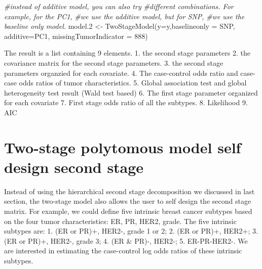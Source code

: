 \documentclass[11pt,]{article}
\newenvironment{Shaded}{\begin{snugshade}}{\end{snugshade}}
\newcommand{\AttributeTok}[1]{\textcolor[rgb]{0.77,0.63,0.00}{#1}}
\newcommand{\CommentTok}[1]{\textcolor[rgb]{0.56,0.35,0.01}{\textit{#1}}}
\newcommand{\DecValTok}[1]{\textcolor[rgb]{0.00,0.00,0.81}{#1}}
\newcommand{\FloatTok}[1]{\textcolor[rgb]{0.00,0.00,0.81}{#1}}
\newcommand{\FunctionTok}[1]{\textcolor[rgb]{0.00,0.00,0.00}{#1}}
\newcommand{\NormalTok}[1]{#1}
\newcommand{\OtherTok}[1]{\textcolor[rgb]{0.56,0.35,0.01}{#1}}
\begin{document}
\begin{Shaded}
\begin{Highlighting}[]
\CommentTok{\#instead of additive model, you can also try }
\CommentTok{\#different combinations. For example, for the PC1,}
\CommentTok{\#we use the additive model, but for SNP,}
\CommentTok{\#we use the baseline only model.}
\NormalTok{model}\FloatTok{.2} \OtherTok{\textless{}{-}} \FunctionTok{TwoStageModel}\NormalTok{(}\AttributeTok{y=}\NormalTok{y,}\AttributeTok{baselineonly =}\NormalTok{ SNP,}
                         \AttributeTok{additive=}\NormalTok{PC1,}
                         \AttributeTok{missingTumorIndicator =} \DecValTok{888}\NormalTok{)}
\end{Highlighting}
\end{Shaded}

The result is a list containing 9 elements. 1. the second stage
parameters 2. the covariance matrix for the second stage parameters. 3.
the second stage parameters organzied for each covariate. 4. The
case-control odds ratio and case-case odds ratios of tumor
characteristics. 5. Global association test and global heterogeneity
test result (Wald test based) 6. The first stage parameter organized for
each covariate 7. First stage odds ratio of all the subtypes. 8.
Likelihood 9. AIC

\hypertarget{two-stage-polytomous-model-self-design-second-stage}{%
\section{Two-stage polytomous model self design second
stage}\label{two-stage-polytomous-model-self-design-second-stage}}

Instead of using the hierarchical second stage decomposition we
discussed in last section, the two-stage model also allows the user to
self design the second stage matrix. For example, we could define five
intrinsic breast cancer subtypes based on the four tumor
characteristics: ER, PR, HER2, grade. The five intrinsic subtypes are:
1. (ER or PR)+, HER2-, grade 1 or 2; 2. (ER or PR)+, HER2+; 3. (ER or
PR)+, HER2-, grade 3; 4. (ER \& PR)-, HER2-; 5. ER-PR-HER2-. We are
interested in estimating the case-control log odds ratios of these
intrinsic subtypes.
\end{document}
